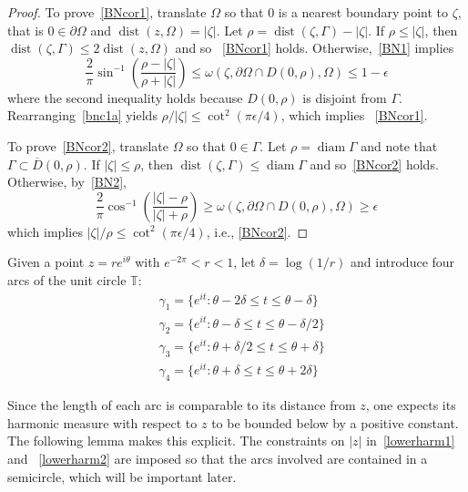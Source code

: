 \documentclass[11pt]{amsart}
\theoremstyle{remark}
\numberwithin{equation}{section}
\newcommand{\T}{\mathbb{T}}
\newcommand{\abs}[1]{\lvert#1\rvert}
\DeclareMathOperator{\dist}{dist}
\DeclareMathOperator{\diam}{diam}
\begin{document}
\begin{proof} To prove~\eqref{BNcor1}, translate $\Omega$ so that $0$ is a nearest boundary point to $\zeta$, that is $0\in\partial\Omega$ and $\dist(z,\Omega) = \abs{\zeta}$. Let $\rho = \dist(\zeta,\Gamma) - \abs{\zeta}$. If $\rho \le \abs{\zeta}$, then $\dist(\zeta,\Gamma) \le 2 \dist(z,\Omega)$ and so ~\eqref{BNcor1} holds. Otherwise,~\eqref{BN1} implies 
\begin{equation}\label{bnc1a}
\frac{2}{\pi}\sin^{-1}\left(\frac{\rho-\abs{\zeta}}{\rho+\abs{\zeta}}\right)
\le \omega(\zeta,\partial \Omega\cap D(0,\rho), \Omega) \le 1-\epsilon 
\end{equation}
where the second inequality holds because $D(0,\rho)$ is disjoint from $\Gamma$. 
Rearranging~\eqref{bnc1a} yields $\rho/\abs{\zeta} \le \cot^2(\pi \epsilon/4)$, which implies ~\eqref{BNcor1}.

To prove~\eqref{BNcor2}, translate $\Omega$ so that $0\in \Gamma$. Let $\rho=\diam\Gamma$ and note that $\Gamma\subset \overline{D}(0,\rho)$. If $\abs{\zeta} \le \rho$, then $\dist(\zeta,\Gamma)\le \diam \Gamma$ and so~\eqref{BNcor2} holds. Otherwise, by~\eqref{BN2},
\begin{equation*}%
\frac{2}{\pi}\cos^{-1}\left(\frac{\abs{\zeta}-\rho}{\abs{\zeta}+\rho}\right)
\ge \omega(\zeta,\partial \Omega\cap D(0,\rho), \Omega) \ge \epsilon 
\end{equation*}
which implies $\abs{\zeta}/\rho \le  \cot^2(\pi \epsilon/4)$, i.e., \eqref{BNcor2}. 
\end{proof}


Given a point $z = re^{i\theta}$ with $e^{-2\pi}<r<1$, let $\delta = \log (1/r)$ and introduce four arcs of the unit circle $\T$: 
\begin{equation}\label{gammacurves}
\begin{split}
&\gamma_1 = \{e^{it}\colon \theta-2\delta \le  t\le \theta - \delta \} \\
&\gamma_2 = \{e^{it}\colon \theta-\delta \le  t\le \theta - \delta/2 \} \\
&\gamma_3 = \{e^{it}\colon \theta+\delta/2 \le  t\le \theta + \delta \} \\
&\gamma_4 = \{e^{it}\colon \theta+\delta \le  t\le \theta + 2\delta\}
\end{split}
\end{equation}

Since the length of each arc is comparable to its distance from $z$, one expects its harmonic measure with respect to $z$ to be bounded below by a positive constant. The following lemma makes this explicit. The constraints on $\abs{z}$ in~\eqref{lowerharm1} and ~\eqref{lowerharm2} are imposed so that the arcs involved are contained in a semicircle, which will be important later. 
\end{document}
